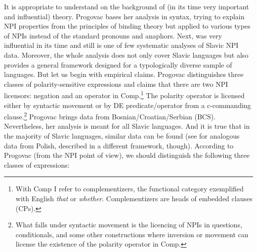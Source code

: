 \documentclass[output=paper,colorlinks,citecolor=brown]{langscibook}
\begin{document}
\noindent It is appropriate to understand \citet{Progovac1993a} on the background of (in its time very important and influential)  theory. Progovac bases her analysis in syntax, trying to explain NPI properties from the principles of binding theory but applied to various types of NPIs instead of the standard pronouns and anaphors. Next, \citet{Progovac1993a} was very influential in its time and still is one of few systematic analyses of Slavic NPI data. Moreover, the whole analysis does not only cover Slavic languages but also provides a general framework designed for a typologically diverse sample of languages. But let us begin with empirical claims. Progovac distinguishes three classes of polarity-sensitive expressions and claims that there are two NPI licensors: negation and an operator in Comp.\footnote{With Comp I refer to complementizers, the functional category exemplified with English \textit{that} or \textit{whether}. Complementizers are heads of embedded clauses (CPs).} The polarity operator is licensed either by syntactic movement or by DE predicate/operator from a c-commanding clause.\footnote{What falls under syntactic movement is the licencing of NPIs in questions, conditionals, and some other constructions where inversion or movement can license the existence of the polarity operator in Comp.} Progovac brings data from Bosnian/Croatian/Serbian (BCS). Nevertheless, her analysis is meant for all Slavic languages. And it is true that in the majority of Slavic languages, similar data can be found (see  for analogous data from Polish, described in a different framework, though). According to Progovac (from the NPI point of view), we should distinguish the following three classes of expressions:
\end{document}
